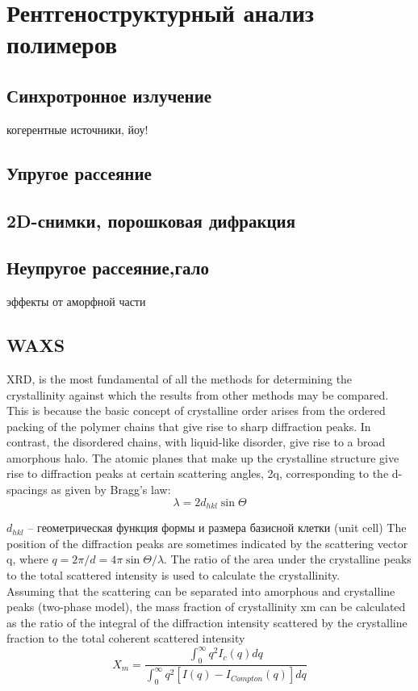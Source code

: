\section{Рентгеноструктурный анализ полимеров}



\subsection{Синхротронное излучение}
когерентные источники, йоу!
\subsection{Упругое рассеяние}
\subsection{2D-снимки, порошковая дифракция}
\subsection{Неупругое рассеяние,гало}
эффекты от аморфной части
\subsection{WAXS}
XRD, is the most fundamental of all
the methods for determining the crystallinity against which the results from
other methods may be compared.\\
This is because the basic concept of crystalline
order arises from the ordered packing of the polymer chains that give rise to sharp
diffraction peaks. In contrast, the disordered chains, with liquid-like disorder, give
rise to a broad amorphous halo. The atomic planes that make up the crystalline
structure give rise to diffraction peaks at certain scattering angles, 2q, corresponding
to the d-spacings as given by Bragg’s law:
\[
\lambda = 2d_{hkl} \sin \Theta
\]

$d_{hkl}$ -- геометрическая функция формы и размера базисной клетки (unit cell)
The position of the diffraction peaks are sometimes indicated by the scattering vector q, where $q = 2\pi/d = 4\pi \sin \Theta / \lambda$. The ratio of the area under the crystalline peaks
to the total scattered intensity is used to calculate the crystallinity.\\
Assuming that the scattering can be separated into amorphous and crystalline
peaks (two-phase model), the mass fraction of crystallinity xm can be calculated
as the ratio of the integral of the diffraction intensity scattered by the crystalline fraction
to the total coherent scattered intensity
\[
X_m = \frac{\int_0^{\infty} q^2 I_c(q) dq}{\int_0^{\infty} q^2 [I(q) - I_{Compton}(q)] dq}
\]

